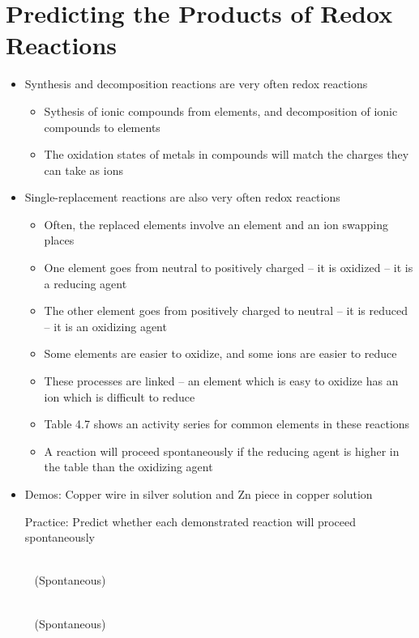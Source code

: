 \documentclass[12pt, openany, letterpaper]{memoir}
\begin{document}
\section{Predicting the Products of Redox Reactions}
\begin{itemize}
	\item Synthesis and decomposition reactions are very often redox reactions
	\begin{itemize}		
		\item Sythesis of ionic compounds from elements, and decomposition of ionic compounds to elements
		\item The oxidation states of metals in compounds will match the charges they can take as ions
	\end{itemize}
	\item Single-replacement reactions are also very often redox reactions
	\begin{itemize}
		\item Often, the replaced elements involve an element and an ion swapping places
		\item One element goes from neutral to positively charged -- it is oxidized -- it is a reducing agent
		\item The other element goes from positively charged to neutral -- it is reduced -- it is an oxidizing agent
		\item Some elements are easier to oxidize, and some ions are easier to reduce
		\item These processes are linked -- an element which is easy to oxidize has an ion which is difficult to reduce
		\item Table 4.7 shows an activity series for common elements in these reactions
		\item A reaction will proceed spontaneously if the reducing agent is higher in the table than the oxidizing agent
	\end{itemize}
	\item Demos: Copper wire in silver solution and Zn piece in copper solution

	Practice: Predict whether each demonstrated reaction will proceed spontaneously

	~\hphantom{Practice:} \\
	~\hphantom{Practice: } (Spontaneous)
	
	~\hphantom{Practice:} \\
	~\hphantom{Practice: } (Spontaneous)
\end{itemize}
\end{document}

